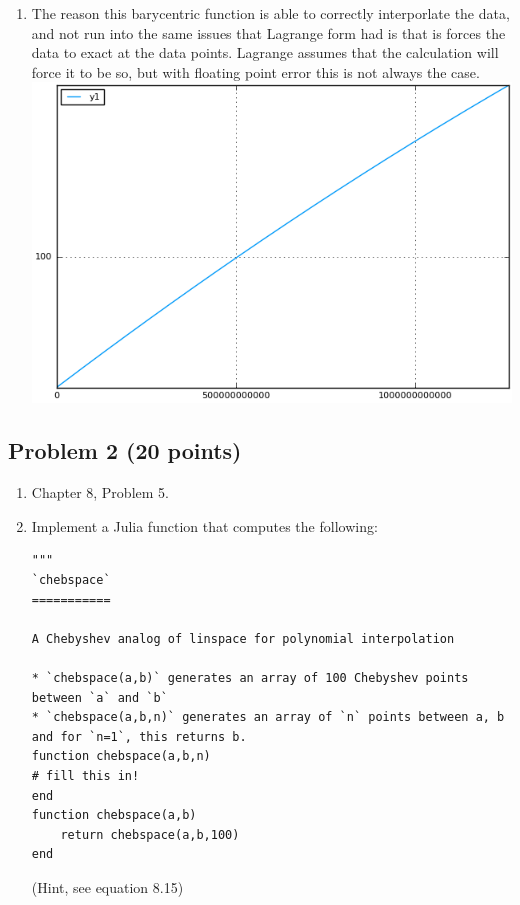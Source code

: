 \documentclass[]{article}
\begin{document}
\begin{enumerate}
\item The reason this barycentric function is able to correctly interporlate the data, and not run into the same issues that Lagrange form had is that is forces the data to exact at the data points. Lagrange assumes that the calculation will force it to be so, but with floating point error this is not always the case. 
\hfill \break
\includegraphics[width=\textwidth,keepaspectratio]{Problem1Images/baryfun.png}
\end{enumerate}


\subsection{Problem 2 (20 points)}\label{problem-2-20-points}

\begin{enumerate}
\def\labelenumi{\arabic{enumi}.}
\item
  Chapter 8, Problem 5.
\item
  Implement a Julia function that computes the following:

\begin{verbatim}
"""
`chebspace`
===========

A Chebyshev analog of linspace for polynomial interpolation

* `chebspace(a,b)` generates an array of 100 Chebyshev points 
between `a` and `b`
* `chebspace(a,b,n)` generates an array of `n` points between a, b
and for `n=1`, this returns b.
function chebspace(a,b,n)
# fill this in!
end
function chebspace(a,b)
    return chebspace(a,b,100)
end
\end{verbatim}

  (Hint, see equation 8.15)
\end{enumerate}
\end{document}
